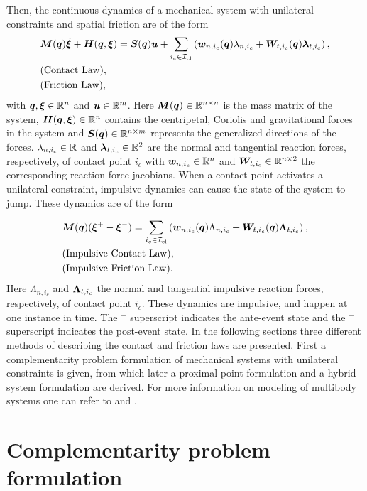 \documentclass[../DC2017114Bouma.tex]{subfiles}
\begin{document}
Then, the continuous dynamics of a mechanical system with unilateral constraints and spatial friction are of the form
\begin{align}
&{\boldsymbol{M}}({\boldsymbol{q}})\dot{\boldsymbol{\xi}} + {\boldsymbol{H}}({\boldsymbol{q}},\boldsymbol{\xi}) = {\boldsymbol{S}}({\boldsymbol{q}}){\boldsymbol{u}} + \sum_{i_c\in\mathcal{I}_{\text{cl}}}\left({\boldsymbol{w}}_{n,i_c}({\boldsymbol{q}})\lambda_{n,i_c} + {\boldsymbol{W}}_{t,i_c}({\boldsymbol{q}})\boldsymbol{\lambda}_{t,i_c} \right), \label{eq:appcont1}\\
&\text{(Contact Law)},\label{eq:appcont2}\\
&\text{(Friction Law)},\label{eq:appcont3}
\end{align}
with ${\boldsymbol{q}},\boldsymbol{\xi}\in\mathbb{R}^{n}$ and ${\boldsymbol{u}}\in\mathbb{R}^m$. Here ${\boldsymbol{M}}({\boldsymbol{q}})\in\mathbb{R}^{n\times n}$ is the mass matrix of the system, ${\boldsymbol{H}}({\boldsymbol{q}},\boldsymbol{\xi})\in\mathbb{R}^{n}$ contains the centripetal, Coriolis and gravitational forces in the system and ${\boldsymbol{S}}({\boldsymbol{q}})\in\mathbb{R}^{n\times m}$ represents the generalized directions of the forces. $\lambda_{n,i_c}\in\mathbb{R}$ and $\boldsymbol{\lambda}_{t,i_c}\in\mathbb{R}^{2}$ are the normal and tangential reaction forces, respectively, of contact point $i_c$ with ${\boldsymbol{w}}_{n,i_c}\in\mathbb{R}^{n}$ and ${\boldsymbol{W}}_{t,i_c}\in\mathbb{R}^{n\times 2}$ the corresponding reaction force jacobians. When a contact point activates a unilateral constraint, impulsive dynamics can cause the state of the system to jump. These dynamics are of the form

\begin{align}
&{\boldsymbol{M}}({\boldsymbol{q}})(\boldsymbol{\xi}^+ - \boldsymbol{\xi}^-) = \sum_{i_c\in\mathcal{I}_{\text{cl}}}\left( {\boldsymbol{w}}_{n,i_c}({\boldsymbol{q}})\Lambda_{n,i_c} + {\boldsymbol{W}}_{t,i_c}({\boldsymbol{q}})\boldsymbol{\Lambda}_{t,i_c}\right), \label{eq:appimp1}\\
&\text{(Impulsive Contact Law)},\label{eq:appimp2}\\
&\text{(Impulsive Friction Law)}.\label{eq:appimp3}
\end{align}
Here $\Lambda_{n,i_c}$ and $\boldsymbol{\Lambda}_{t,i_c}$ the normal and tangential impulsive reaction forces, respectively, of contact point $i_c$. These dynamics are impulsive, and happen at one instance in time. The $^-$ superscript indicates the ante-event state and the $^+$ superscript indicates the post-event state. In the following sections three different methods of describing the contact and friction laws are presented. First a complementarity problem formulation of mechanical systems with unilateral constraints is given, from which later a proximal point formulation and a hybrid system formulation are derived. For more information on modeling of multibody systems one can refer to \cite{Leine2008} and \cite{Wouw2016}.

\section{Complementarity problem formulation}\label{sec:comp}
\end{document}
